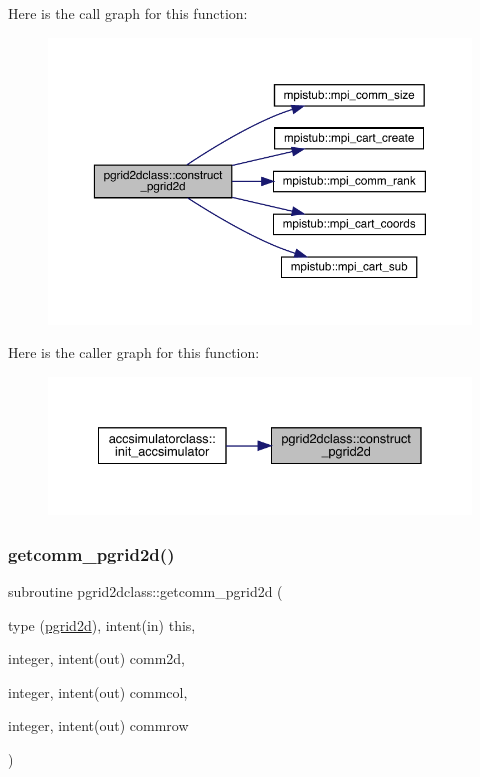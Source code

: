 Here is the call graph for this function\+:\nopagebreak
\begin{figure}[H]
\begin{center}
\leavevmode
\includegraphics[width=350pt]{namespacepgrid2dclass_a93b626c7a473ab28463a29b9661dcefb_cgraph}
\end{center}
\end{figure}
Here is the caller graph for this function\+:\nopagebreak
\begin{figure}[H]
\begin{center}
\leavevmode
\includegraphics[width=335pt]{namespacepgrid2dclass_a93b626c7a473ab28463a29b9661dcefb_icgraph}
\end{center}
\end{figure}
\mbox{\label{namespacepgrid2dclass_a550cb1b5c94a9e168c3e0108bb8a6d5b}} 
\subsubsection{\texorpdfstring{getcomm\_pgrid2d()}{getcomm\_pgrid2d()}}
{\footnotesize\ttfamily subroutine pgrid2dclass\+::getcomm\+\_\+pgrid2d (\begin{DoxyParamCaption}\item[{type (\mbox{\hyperlink{namespacepgrid2dclass_structpgrid2dclass_1_1pgrid2d}{pgrid2d}}), intent(in)}]{this,  }\item[{integer, intent(out)}]{comm2d,  }\item[{integer, intent(out)}]{commcol,  }\item[{integer, intent(out)}]{commrow }\end{DoxyParamCaption})}



